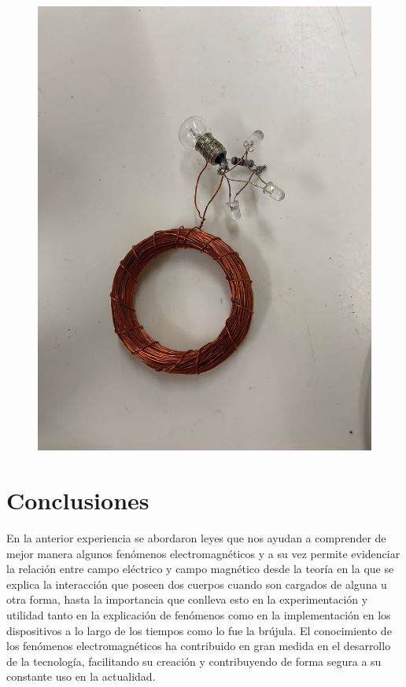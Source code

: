 \documentclass[twocolumn, 12pt]{article}
\begin{document}
\begin{figure}[H]
	\includegraphics[width=0.9\linewidth]{./Images/Foquito.jpeg}
\end{figure}

\section{Conclusiones}

En la anterior experiencia se abordaron leyes que nos
ayudan a comprender de mejor manera algunos fenómenos
electromagnéticos y a su vez permite evidenciar la relación
entre campo eléctrico y campo magnético desde la teoría en
la que se explica la interacción que poseen dos cuerpos
cuando son cargados de alguna u otra forma, hasta la
importancia que conlleva esto en la experimentación y
utilidad tanto en la explicación de fenómenos como en la
implementación en los dispositivos a lo largo de los
tiempos como lo fue la brújula. El conocimiento de los
fenómenos electromagnéticos ha contribuido en gran medida
en el desarrollo de la tecnología, facilitando su creación
y contribuyendo de forma segura a su constante uso en la
actualidad.

\printbibliography
\end{document}
